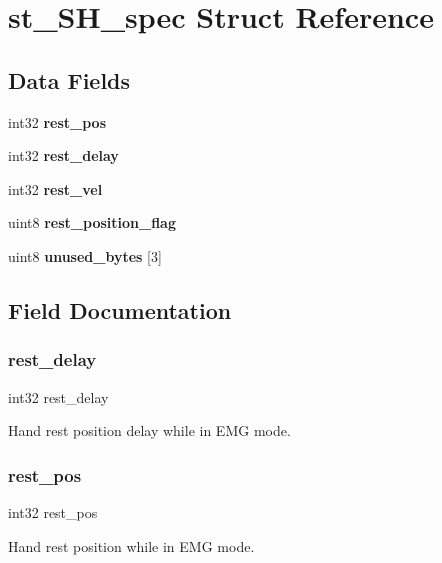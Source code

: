 \section{st\+\_\+\+S\+H\+\_\+spec Struct Reference}
\label{structst___s_h__spec}
\subsection*{Data Fields}
\begin{DoxyCompactItemize}
\item 
int32 \textbf{ rest\+\_\+pos}
\item 
int32 \textbf{ rest\+\_\+delay}
\item 
int32 \textbf{ rest\+\_\+vel}
\item 
uint8 \textbf{ rest\+\_\+position\+\_\+flag}
\item 
uint8 \textbf{ unused\+\_\+bytes} [3]
\end{DoxyCompactItemize}


\subsection{Field Documentation}
\mbox{\label{structst___s_h__spec_a0c8e71bf78005976d2887594a9808eda}} 
\subsubsection{rest\+\_\+delay}
{\footnotesize\ttfamily int32 rest\+\_\+delay}

Hand rest position delay while in E\+MG mode. \mbox{\label{structst___s_h__spec_a27742da1d6ad36d8051848f9e4346146}} 
\subsubsection{rest\+\_\+pos}
{\footnotesize\ttfamily int32 rest\+\_\+pos}

Hand rest position while in E\+MG mode. \mbox{\label{structst___s_h__spec_a8a4aa5efee4b9d62ea71a1459cf3ac3b}} 
